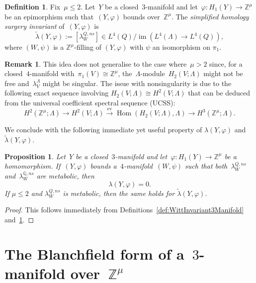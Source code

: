 \documentclass[10.9pt,a4paper]{amsart}
\newtheorem{proposition}[theorem]{Proposition}
\theoremstyle{definition}
\newtheorem{definition}[theorem]{Definition}
\newtheorem{remark}[theorem]{Remark}
\theoremstyle{remark}
\newcommand{\Z}{\mathbb{Z}}
\newcommand{\Q}{\mathbb{Q}}
\newcommand{\ev}{\operatorname{ev}}
\newcommand{\im}{\operatorname{im}}
\newcommand{\Hom}{\operatorname{Hom}}
\begin{document}
\begin{definition}
\label{def:WittInvariant3ManifoldSimplified}
Fix~$\mu\le 2$.
 Let~$Y$ be a closed~$3$-manifold and let~$\varphi \colon H_1(Y) \to \Z^\mu$ be an epimorphism such that~$(Y,\varphi)$ bounds over~$\Z^\mu$.
The \emph{simplified homology surgery invariant} of~$(Y,\varphi)$ is 
$$ 
\widetilde{\lambda}(Y,\varphi):=[\lambda_W^{Q,\textit{ns}}] \in L^4(Q)/\im(L^4(\Lambda) \to L^4(Q)),
$$
where $(W,\psi)$ is a $\Z^\mu$-filling of $(Y,\varphi)$ with $\psi$ an isomorphism on $\pi_1$.
\end{definition}



\begin{remark}
\label{rem:mu=1Trick}
This idea does not generalise to the case where~$\mu>2$ since,  for a closed~$4$-manifold with~$\pi_1(V) \cong \Z^\mu$, the~$\Lambda$-module~$H_2(V;\Lambda)$ might not be free and~$\lambda^{\Lambda}_V$ might be singular.
The issue with nonsingularity 
is due to the following exact sequence involving $H_2(V;\Lambda) \cong H^2(V;\Lambda)$ that can be deduced from the universal coefficient spectral sequence (UCSS):
$$
H^2(\Z^\mu;\Lambda)
\to
H^2(V;\Lambda)
\xrightarrow{\ev} 
\Hom(H_2(V;\Lambda),\Lambda)
\to
H^3(\Z^\mu;\Lambda).
$$
\end{remark}


We conclude with the following immediate yet useful property of $\lambda(Y,\varphi)$ and~$\widetilde{\lambda}(Y,\varphi)$.

\begin{proposition}
\label{prop:WittCobordismInvariant}
Let~$Y$ be a closed~$3$-manifold and let~$\varphi \colon H_1(Y) \to \Z^\mu$ be a homomorphism.
If~$(Y,\varphi)$ bounds a~$4$-manifold~$(W,\psi)$ such that both~$\lambda_W^{Q,\textit{ns}}$ and~$\lambda_W^{\Q,\textit{ns}}$ are metabolic, then 
$$ \lambda(Y,\varphi)=0.$$
If $\mu \leq 2$ and $\lambda_W^{Q,\textit{ns}}$ is metabolic, then the same holds for $\widetilde{\lambda}(Y,\varphi)$.
\end{proposition}
\begin{proof}
This follows immediately from Definitions~\ref{def:WittInvariant3Manifold} and~\ref{def:WittInvariant3ManifoldSimplified}.
\end{proof}



\section{The Blanchfield form of a~$3$-manifold over~$\Z^\mu$}
\label{sec:Blanchfield}
\end{document}
